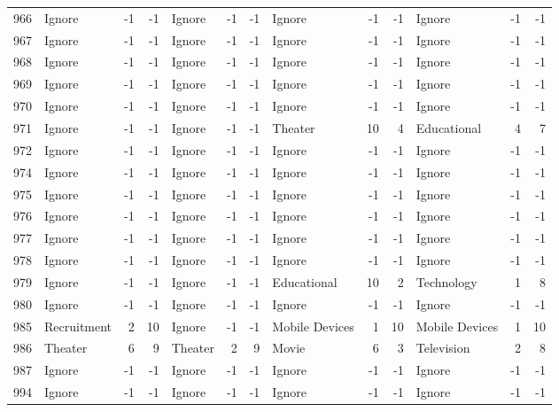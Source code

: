 \begin{figure}[htbp]
\begin{tabular}{rlrrlrrlrrlrr}
    966   & Ignore & -1    & -1    & Ignore & -1    & -1    & Ignore & -1    & -1    & Ignore & -1    & -1 \\
    967   & Ignore & -1    & -1    & Ignore & -1    & -1    & Ignore & -1    & -1    & Ignore & -1    & -1 \\
    968   & Ignore & -1    & -1    & Ignore & -1    & -1    & Ignore & -1    & -1    & Ignore & -1    & -1 \\
    969   & Ignore & -1    & -1    & Ignore & -1    & -1    & Ignore & -1    & -1    & Ignore & -1    & -1 \\
    970   & Ignore & -1    & -1    & Ignore & -1    & -1    & Ignore & -1    & -1    & Ignore & -1    & -1 \\
    971   & Ignore & -1    & -1    & Ignore & -1    & -1    & Theater & 10    & 4     & Educational & 4     & 7 \\
    972   & Ignore & -1    & -1    & Ignore & -1    & -1    & Ignore & -1    & -1    & Ignore & -1    & -1 \\
    974   & Ignore & -1    & -1    & Ignore & -1    & -1    & Ignore & -1    & -1    & Ignore & -1    & -1 \\
    975   & Ignore & -1    & -1    & Ignore & -1    & -1    & Ignore & -1    & -1    & Ignore & -1    & -1 \\
    976   & Ignore & -1    & -1    & Ignore & -1    & -1    & Ignore & -1    & -1    & Ignore & -1    & -1 \\
    977   & Ignore & -1    & -1    & Ignore & -1    & -1    & Ignore & -1    & -1    & Ignore & -1    & -1 \\
    978   & Ignore & -1    & -1    & Ignore & -1    & -1    & Ignore & -1    & -1    & Ignore & -1    & -1 \\
    979   & Ignore & -1    & -1    & Ignore & -1    & -1    & Educational & 10    & 2     & Technology & 1     & 8 \\
    980   & Ignore & -1    & -1    & Ignore & -1    & -1    & Ignore & -1    & -1    & Ignore & -1    & -1 \\
    985   & Recruitment & 2     & 10    & Ignore & -1    & -1    & Mobile Devices & 1     & 10    & Mobile Devices & 1     & 10 \\
    986   & Theater & 6     & 9     & Theater & 2     & 9     & Movie & 6     & 3     & Television & 2     & 8 \\
    987   & Ignore & -1    & -1    & Ignore & -1    & -1    & Ignore & -1    & -1    & Ignore & -1    & -1 \\
    994   & Ignore & -1    & -1    & Ignore & -1    & -1    & Ignore & -1    & -1    & Ignore & -1    & -1 \\

\end{tabular}
\end{figure}
